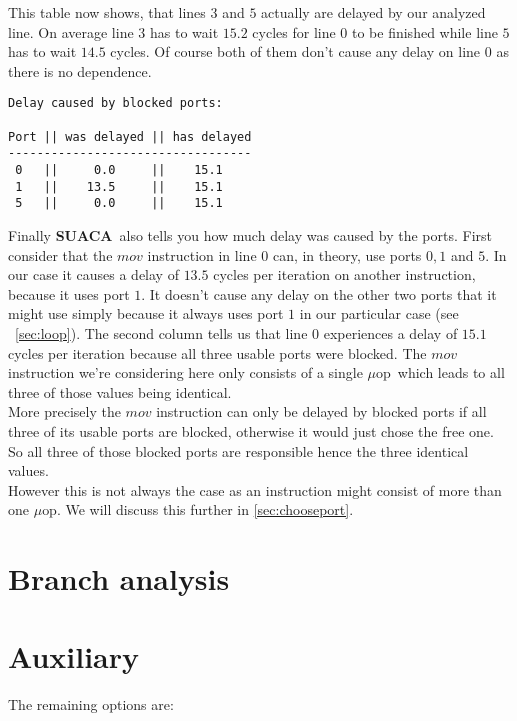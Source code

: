 \documentclass[a4paper,12pt,titlepage, twoside]{report}
\newcommand{\suaca}{\textbf{SUACA}}
\newcommand{\microop}{$\mu$op}
\begin{document}
This table now shows, that lines $3$ and $5$ actually are delayed by our analyzed line. On average line $3$ has to wait $15.2$ cycles for line $0$ to be finished while line $5$ has to wait $14.5$ cycles. Of course both of them don't cause any delay on line $0$ as there is no dependence.\\


\begin{Verbatim}[fontsize=\scriptsize]
Delay caused by blocked ports:

Port || was delayed || has delayed
----------------------------------
 0   ||     0.0     ||    15.1
 1   ||    13.5     ||    15.1
 5   ||     0.0     ||    15.1
\end{Verbatim}

Finally \suaca\ also tells you how much delay was caused by the ports. First consider that the $mov$ instruction in line $0$ can, in theory, use ports $0, 1$ and $5$. In our case it causes a delay of $13.5$ cycles per iteration on another instruction, because it uses port $1$. It doesn't cause any delay on the other two ports that it might use simply because it always uses port $1$ in our particular case (see ~\autoref{sec:loop}). The second column tells us that line $0$ experiences a delay of $15.1$ cycles per iteration because all three usable ports were blocked. The $mov$ instruction we're considering here only consists of a single \microop\ which leads to all three of those values being identical.\\
More precisely the $mov$ instruction can only be delayed by blocked ports if all three of its usable ports are blocked, otherwise it would just chose the free one. So all three of those blocked ports are responsible hence the three identical values.\\
However this is not always the case as an instruction might consist of more than one \microop. We will discuss this further in \autoref{sec:chooseport}.


\section{Branch analysis}




\section{Auxiliary}
The remaining options are:
\end{document}
